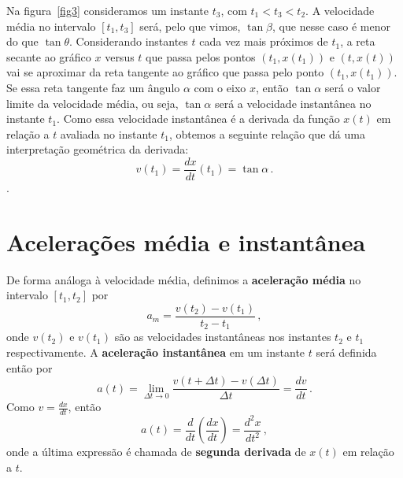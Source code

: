 \documentclass[12pt, a4paper]{article}
\newcommand{\dpar}[1]{\left(#1\right)}
\begin{document}
Na figura~\ref{fig3} consideramos um instante $t_3$, com $t_1<t_3<t_2$. A velocidade média no intervalo $[t_1,t_3]$ será, pelo que vimos, $\tan\beta$, que nesse caso é menor do que $\tan\theta$. Considerando instantes $t$ cada vez mais próximos de $t_1$, a reta secante ao gráfico $x$ versus $t$ que passa pelos pontos $(t_1,x(t_1))$ e $(t,x(t))$ vai se aproximar da reta tangente ao gráfico que passa pelo ponto $(t_1,x(t_1))$. Se essa reta tangente faz um ângulo $\alpha$ com o eixo $x$, então $\tan\alpha$ será o valor limite da velocidade média, ou seja, $\tan\alpha$ será a velocidade instantânea no instante $t_1$. Como essa velocidade instantânea é a derivada da função $x(t)$ em relação a $t$ avaliada no instante $t_1$, obtemos a seguinte relação que dá uma interpretação geométrica da derivada:
$$v(t_1)=\frac{dx}{dt}(t_1)=\tan\alpha\,.$$.

\section{Acelerações média e instantânea}
De forma análoga à velocidade média, definimos a \textbf{aceleração média} no intervalo $[t_1,t_2]$ por
$$a_m=\frac{v(t_2)-v(t_1)}{t_2-t_1}\,,$$
onde $v(t_2)$ e $v(t_1)$ são as velocidades instantâneas nos instantes $t_2$ e $t_1$ respectivamente. A \textbf{aceleração instantânea} em um instante $t$ será definida então por
$$a(t)=\lim_{\Delta t\to 0}\frac{v(t+\Delta t)-v(\Delta t)}{\Delta t}=\frac{dv}{dt}\,.$$
Como $v=\frac{dx}{dt}$, então
$$a(t)=\frac{d}{dt}\dpar{\frac{dx}{dt}}=\frac{d^2x}{dt^2}\,,$$
onde a última expressão é chamada de \textbf{segunda derivada} de $x(t)$ em relação a $t$.
\end{document}
